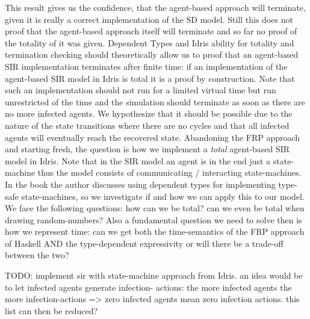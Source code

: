 This result gives us the confidence, that the agent-based approach will terminate, given it is really a correct implementation of the SD model. Still this does not proof that the agent-based approach itself will terminate and so far no proof of the totality of it was given. Dependent Types and Idris ability for totality and termination checking should theoretically allow us to proof that an agent-based SIR implementation terminates after finite time: if an implementation of the agent-based SIR model in Idris is total it is a proof by construction. Note that such an implementation should not run for a limited virtual time but run unrestricted of the time and the simulation should terminate as soon as there are no more infected agents. We hypothesize that it should be possible due to the nature of the state transitions where there are no cycles and that all infected agents will eventually reach the recovered state. 
Abandoning the FRP approach and starting fresh, the question is how we implement a \textit{total} agent-based SIR model in Idris. Note that in the SIR model an agent is in the end just a state-machine thus the model consists of communicating / interacting state-machines. In the book \cite{brady_type-driven_2017} the author discusses using dependent types for implementing type-safe state-machines, so we investigate if and how we can apply this to our model. We face the following questions: how can we be total? can we even be total when drawing random-numbers? Also a fundamental question we need to solve then is how we represent time: can we get both the time-semantics of the FRP approach of Haskell AND the type-dependent expressivity or will there be a trade-off between the two?

TODO: implement sir with state-machine approach from Idris. an idea would be to let infected agents generate infection- actions: the more infected agents the more infection-actions => zero infected agents mean zero infection actions. this list can then be reduced?